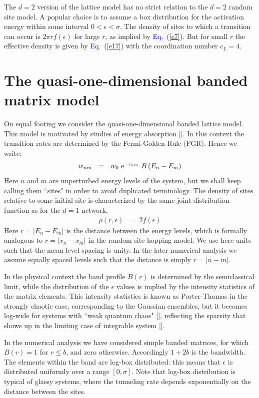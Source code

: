 \documentclass[aps,pre,floats,floatfix,twocolumn]{revtex4}
\newcommand{\eexp}{\mbox{e}^}
\newcommand{\mylabel}[1]{\label{#1}}
\newcommand{\beq}{\begin{eqnarray}}
\newcommand{\eeq}{\end{eqnarray}}
\newcommand{\be}[1]{\begin{eqnarray}\ifthenelse{#1=-1}
{\nonumber}{\ifthenelse{#1=0}{}{\mylabel{e#1}}}}
\newcommand{\Eq}[1]{\textcolor{blue}{Eq.\!\!~(\ref{#1})}}
\renewcommand{\cite}[1]{\textcolor{blue}{[\onlinecite{#1}}]} %
\begin{document}
The $d{=}2$ version of the lattice model has no 
strict relation to the $d{=}2$ random site model. 
A popular choice is to assume a box distribution
for the activation energy within 
some interval ${0<\epsilon<\sigma}$. 
The density of sites to which a transition can occur 
is $2\pi r f(\epsilon)$ for large $r$, 
as implied by \Eq{e7}. But for small $r$  
the effective density is given by \Eq{e17}
with the coordination number ${c_L=4}$.


\section{The quasi-one-dimensional banded matrix model}

\label{aBanded}

On equal footing we consider the quasi-one-dimensional banded lattice model.
This model is motivated by studies of energy absorption \cite{slk}.
In this context the transition rates are determined 
by the Fermi-Golden-Rule (FGR). Hence we write:
%
\be{143}
w_{nm} \ \ = \ \ w_0 \ \eexp{-\epsilon_{nm}} \ B\left(E_n-E_m\right)
\eeq
% 
Here $n$ and $m$ are unperturbed energy levels of the system, 
but we shall keep calling them ``sites" in order to avoid 
duplicated terminology.
The density of sites relative to some initial site 
is characterized by the same joint distribution function
as for the $d{=}1$ network,  
%
\beq
\rho(r,\epsilon) \ \ = \ \ 2f(\epsilon) 
\eeq 
%
Here $r=|E_n-E_m|$ is the distance between the energy levels, 
which is formally analogous to $r=|x_n-x_m|$ in the random site hopping model.
We use here units such that the mean level spacing is unity.
In the later numerical analysis we assume equally spaced levels 
such that the distance is simply ${r=|n-m|}$. 

In the physical context the band profile $B(r)$ is determined 
by the semiclassical limit, while the distribution of the $\epsilon$ 
values is implied by the intensity statistics of the matrix elements.
This intensity statistics is known as Porter-Thomas in the strongly 
chaotic case, corresponding to the Gaussian ensembles, 
but it becomes log-wide for systems with ``weak quantum chaos" \cite{SparseMat},
reflecting the sparsity that shows up in the limiting
case of integrable system \cite{kbw}. 

In the numerical analysis we have considered simple 
banded matrices, for which $B(r)=1$ for ${r \leq b}$, 
and zero otherwise. Accordingly $1{+}2b$ is the bandwidth.
The elements within the band are log-box distributed:
this means that $\epsilon$ is distributed uniformly over a range $[0,\sigma]$.  
Note that log-box distribution is typical of glassy systems, 
where the tunneling rate depends exponentially on the distance  
between the sites.
\end{document}
